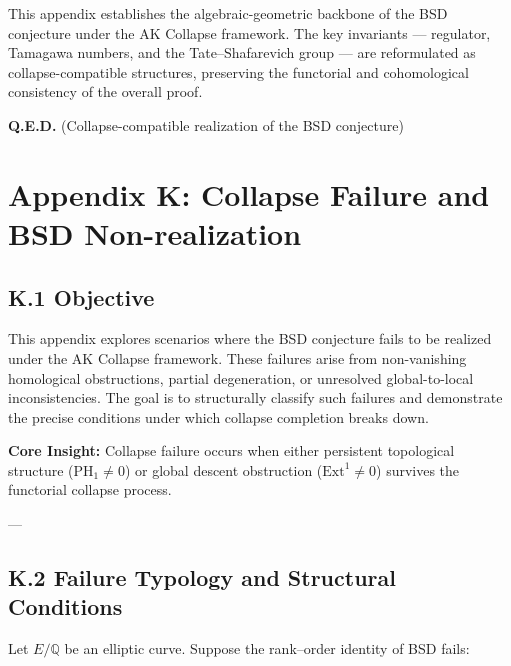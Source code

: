 \documentclass[11pt]{article}
\begin{document}
This appendix establishes the algebraic-geometric backbone of the BSD conjecture under the AK Collapse framework. The key invariants — regulator, Tamagawa numbers, and the Tate–Shafarevich group — are reformulated as collapse-compatible structures, preserving the functorial and cohomological consistency of the overall proof.

\begin{center}
\textbf{Q.E.D.} (Collapse-compatible realization of the BSD conjecture)
\end{center}




\section*{Appendix K: Collapse Failure and BSD Non-realization}

\subsection*{K.1 Objective}

This appendix explores scenarios where the BSD conjecture fails to be realized under the AK Collapse framework. These failures arise from non-vanishing homological obstructions, partial degeneration, or unresolved global-to-local inconsistencies. The goal is to structurally classify such failures and demonstrate the precise conditions under which collapse completion breaks down.

\begin{center}
\textbf{Core Insight:} Collapse failure occurs when either persistent topological structure ($\mathrm{PH}_1 \neq 0$) or global descent obstruction ($\mathrm{Ext}^1 \neq 0$) survives the functorial collapse process.
\end{center}

---

\subsection*{K.2 Failure Typology and Structural Conditions}

Let $E/\mathbb{Q}$ be an elliptic curve. Suppose the rank–order identity of BSD fails:
\end{document}
